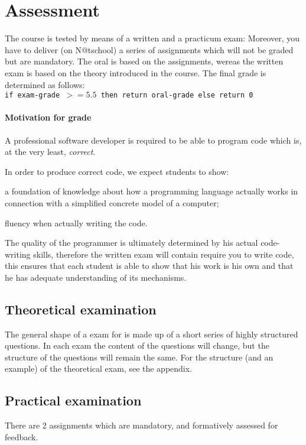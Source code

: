 \section{Assessment}
The course is tested by means of a written and a practicum exam:
Moreover, you have to deliver (on N@tschool) a series of \glspl{assignment} which will not be graded but are mandatory. The \gls{oral} is based on the \glspl{assignment}, wereas the written exam is based on the theory introduced in the course. The final grade is determined as follows: \\

\texttt{if \gls{exam}-grade $ >= 5.5 $ then return \gls{oral}-grade else return 0}

\paragraph*{Motivation for grade}
A professional software developer is required to be able to program code which is, at the very least, \textit{correct}.

In order to produce correct code, we expect students to show:
\begin{inparaenum}
\item a foundation of knowledge about how a programming language actually works in connection with a simplified concrete model of a computer;
\item fluency when actually writing the code.
\end{inparaenum}

The quality of the programmer is ultimately determined by his actual code-writing skills, therefore the written exam will contain require you to write code, this ensures that each student is able to show that his work is his own and that he has adequate understanding of its mechanisms.



\subsection{Theoretical examination \modulecode}
The general shape of a \gls{exam} for \texttt{\modulecode} is made up of a short series of highly structured questions.
In each exam the content of the questions will change, but the structure of the questions will remain the same.
For the structure (and an example) of the theoretical exam, see the appendix.


\subsection{Practical examination \modulecode}
There are 2 \glspl{assignment} which are mandatory, and formatively assessed for \gls{feedback}.

